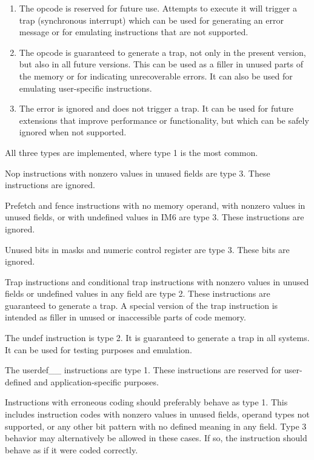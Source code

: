 \documentclass[forwardcom.tex]{subfiles}
\begin{document}
\begin{enumerate}
\item The opcode is reserved for future use. Attempts to execute it will trigger a trap (synchronous interrupt) which can be used for generating an error message or for emulating instructions that are not supported.
\item The opcode is guaranteed to generate a trap, not only in the present version, but also in all future versions. This can be used as a filler in unused parts of the memory or for indicating unrecoverable errors. It can also be used for emulating user-specific instructions.
\item The error is ignored and does not trigger a trap. It can be used for future extensions that improve performance or functionality, but which can be safely ignored when not supported.
\end{enumerate}

All three types are implemented, where type 1 is the most common.
\vv

Nop instructions with nonzero values in unused fields are type 3. These instructions are ignored.
\vv

Prefetch and fence instructions with no memory operand, with nonzero values in unused fields, or with undefined values in IM6 are type 3. These instructions are ignored.
\vv

Unused bits in masks and numeric control register are type 3. These bits are ignored.
\vv

Trap instructions and conditional trap instructions with nonzero values in unused fields or undefined values in any field are type 2. These instructions are guaranteed to generate a trap. A special version of the trap instruction is intended as filler in unused or inaccessible parts of code memory.
\vv

The undef instruction is type 2. It is guaranteed to generate a trap in all systems. It can be used for testing purposes and emulation.
\vv

The userdef\_\_ instructions are type 1. These instructions are reserved for user-defined and application-specific purposes.
\vv

Instructions with erroneous coding should preferably behave as type 1. This includes instruction codes with nonzero values in unused fields, operand types not supported, or any other bit pattern with no defined meaning in any field. Type 3 behavior may alternatively be allowed in these cases. If so, the instruction should behave as if it were coded correctly.
\vv
\end{document}
